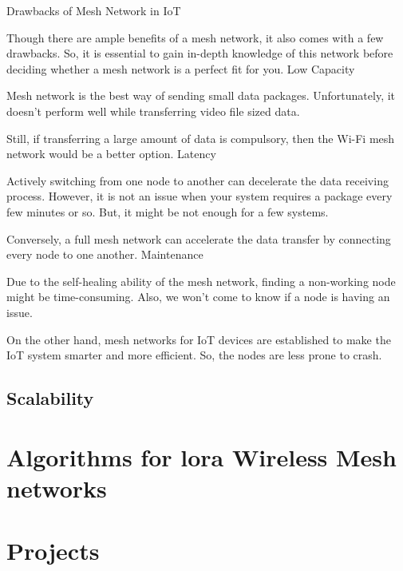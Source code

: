 			Drawbacks of Mesh Network in IoT
			
			Though there are ample benefits of a mesh network, it also comes with a few drawbacks. So, it is essential to gain in-depth knowledge of this network before deciding whether a mesh network is a perfect fit for you.
			Low Capacity
			
			Mesh network is the best way of sending small data packages. Unfortunately, it doesn’t perform well while transferring video file sized data.
			
			Still, if transferring a large amount of data is compulsory, then the Wi-Fi mesh network would be a better option.
			Latency
			
			Actively switching from one node to another can decelerate the data receiving process. However, it is not an issue when your system requires a package every few minutes or so. But, it might be not enough for a few systems.
			
			Conversely, a full mesh network can accelerate the data transfer by connecting every node to one another.
			Maintenance
			
			Due to the self-healing ability of the mesh network, finding a non-working node might be time-consuming. Also, we won’t come to know if a node is having an issue.
			
			On the other hand, mesh networks for IoT devices are established to make the IoT system smarter and more efficient. So, the nodes are less prone to crash.
	
		\subsection{Scalability}
		
			
			
	
	\section{Algorithms for lora Wireless Mesh networks}
	
	
	\section{Projects}\label{sec:chap4_projects}
		
